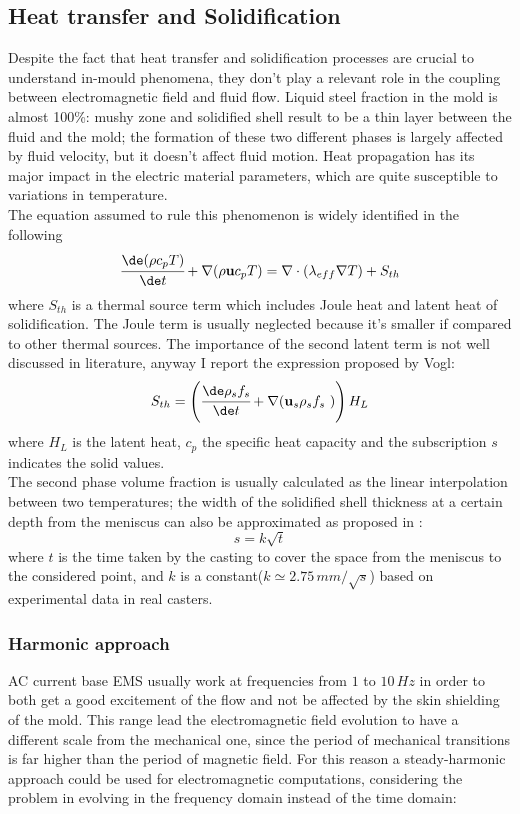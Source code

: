 \subsection{Heat transfer and Solidification}
Despite the fact that heat transfer and solidification processes are crucial to understand in-mould phenomena, they don't play a relevant role in the coupling between electromagnetic field and fluid flow. Liquid steel fraction in the mold is almost 100\%: mushy zone and solidified shell result to be a thin layer between the fluid and the mold; the formation of these two different phases is largely affected by fluid velocity, but it doesn't affect fluid motion. Heat propagation has its major impact in the electric material parameters, which are quite susceptible to variations in temperature.\\
The equation assumed to rule this phenomenon is widely identified in the following
\begin{equation}
\cfrac{\de(\rho c_pT)}{\de t}+\nabla(\rho \textbf{u} c_pT)=\nabla \cdot (\lambda_{eff}\nabla T)+S_{th}
\end{equation}
where $S_{th}$ is a thermal source term which includes Joule heat and latent heat of solidification. The Joule term is usually neglected because it's smaller if compared to other thermal sources. The importance of the second latent term is not well discussed in literature, anyway I report the expression proposed by Vogl\cite{Vogl2014}:
\begin{equation}
S_{th}=\left( \cfrac{\de \rho_s f_s}{\de t} + \nabla(\textbf{u}_s \rho_s f_s~) \right)H_L
\end{equation}
where $H_L$ is the latent heat, $c_p$ the specific heat capacity and the subscription $s$ indicates the solid values.\\
The second phase volume fraction is usually calculated as the linear interpolation between two temperatures; the width of the solidified shell thickness at a certain depth from the meniscus can also be approximated as proposed in \cite{Singh2014}:
\begin{equation}
s=k\sqrt{t}
\end{equation}
where $t$ is the time taken by the casting to cover the space from the meniscus to the considered point, and $k$ is a constant($k\simeq 2.75\, mm/\sqrt{s}$) based on experimental data in real casters.

\subsubsection{Harmonic approach}
AC current base EMS usually work at frequencies from $1$ to $10\, Hz$ in order to both get a good excitement of the flow and not be affected by the skin shielding of the mold. This range lead the electromagnetic field evolution to have a different scale from the mechanical one, since the period of mechanical transitions is far higher than the period of magnetic field. For this reason a steady-harmonic approach could be used for electromagnetic computations, considering the problem in evolving in the frequency domain instead of the time domain:


